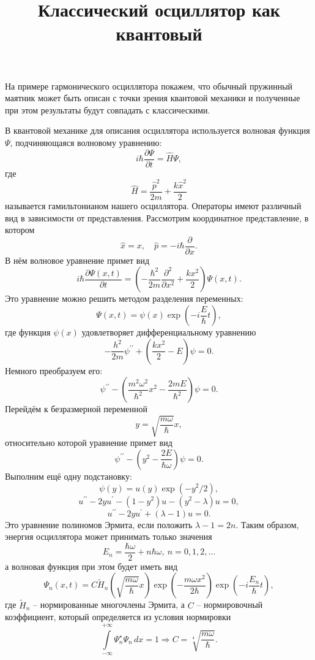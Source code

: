 \documentclass{ncc}
\title{Классический осциллятор как квантовый}
\begin{document}
\maketitle

На примере гармонического осциллятора покажем, что обычный пружинный маятник может быть описан с точки зрения квантовой механики и полученные при этом результаты будут совпадать с классическими.

В квантовой механике для описания осциллятора используется волновая функция \(\Psi\), подчиняющаяся волновому уравнению:
\[
    i\hbar\frac{\partial \Psi}{\partial t} = \hat{H}\Psi,
\]
где
\[
    \hat{H} = \frac{\hat{p}^2}{2m} + \frac{k\hat{x}^2}{2}
\]
называется гамильтонианом нашего осциллятора. Операторы имеют различный вид в зависимости от представления. Рассмотрим координатное представление, в котором
\[
    \hat{x} = x,\quad \hat{p} = -i\hbar\frac{\partial}{\partial x}.
\]
В нём волновое уравнение примет вид
\[
    i\hbar\frac{\partial \Psi(x,t)}{\partial t} = \left( -\frac{\hbar^2}{2m}\frac{\partial^2}{\partial x^2} + \frac{kx^2}{2} \right)\Psi(x,t).
\]
Это уравнение можно решить методом разделения переменных:
\[
    \Psi(x,t) = \psi(x)\exp\left(-i\frac{E}{\hbar}t\right),
\]
где функция \(\psi(x)\) удовлетворяет дифференциальному уравнению
\[
    -\frac{h^2}{2m}\psi^{\prime\prime} + \left(\frac{kx^2}{2} - E\right)\psi = 0.
\]
Немного преобразуем его:
\[
    \psi^{\prime\prime} - \left(\frac{m^2\omega^2}{\hbar^2}x^2 - \frac{2mE}{\hbar^2}\right)\psi = 0.
\]
Перейдём к безразмерной переменной
\[
    y = \sqrt{\frac{m\omega}{\hbar}}x,
\]
относительно которой уравнение примет вид
\[
    \psi^{\prime\prime} - \left(y^2 - \frac{2E}{\hbar\omega}\right)\psi = 0.
\]
Выполним ещё одну подстановку:
\[
    \psi(y) = u(y)\exp(-y^2/2),
\]
\[
    u^{\prime\prime} - 2y u^\prime - (1 - y^2)u - (y^2 - \lambda)u = 0,
\]
\[
    u^{\prime\prime} - 2y u^\prime + (\lambda - 1)u = 0.
\]
Это уравнение полиномов Эрмита, если положить \( \lambda - 1 = 2n \).
Таким образом, энергия осциллятора может принимать только значения
\[
    E_n = \frac{\hbar\omega}{2} + n\hbar\omega,\ n=0,1,2,\ldots
\]
а волновая функция при этом будет иметь вид
\[
    \Psi_n(x, t) = C\tilde{H}_n\left(\sqrt{\frac{m\omega}{\hbar}}x\right)\exp\left(-\frac{m\omega x^2}{2\hbar}\right)\exp\left(-i\frac{E_n}{\hbar}t\right),
\]
где \( \tilde{H}_n \) -- нормированные многочлены Эрмита, а \( C \) -- нормировочный коэффициент, который определяется из условия нормировки
\[
    \int\limits_{-\infty}^{+\infty} \Psi_n^\star  \Psi_n\,dx = 1 \Rightarrow
    C = \sqrt[4]{\frac{m\omega}{\hbar}}.
\]
\end{document}
